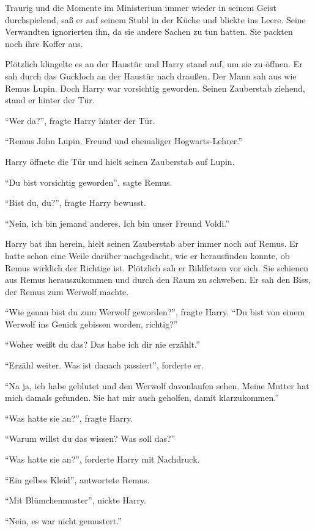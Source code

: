 Traurig und die Momente im Ministerium immer wieder in seinem Geist durchspielend, saß er auf seinem Stuhl in der Küche und blickte ins Leere. Seine Verwandten ignorierten ihn, da sie andere Sachen zu tun hatten. Sie packten noch ihre Koffer aus.

Plötzlich klingelte es an der Haustür und Harry stand auf, um sie zu öffnen. Er sah durch das Guckloch an der Haustür nach draußen. Der Mann sah aus wie Remus Lupin. Doch Harry war vorsichtig geworden. Seinen Zauberstab ziehend, stand er hinter der Tür.

\enquote{Wer da?}, fragte Harry hinter der Tür.

\enquote{Remus John Lupin. Freund und ehemaliger Hogwarts-Lehrer.}

Harry öffnete die Tür und hielt seinen Zauberstab auf Lupin.

\enquote{Du bist vorsichtig geworden}, sagte Remus.

\enquote{Bist du, du?}, fragte Harry bewusst.

\enquote{Nein, ich bin jemand anderes. Ich bin unser Freund Voldi.}

Harry bat ihn herein, hielt seinen Zauberstab aber immer noch auf Remus. Er hatte schon eine Weile darüber nachgedacht, wie er herausfinden konnte, ob Remus wirklich der Richtige ist. Plötzlich sah er Bildfetzen vor sich. Sie schienen aus Remus herauszukommen und durch den Raum zu schweben. Er sah den Biss, der Remus zum Werwolf machte.

\enquote{Wie genau bist du zum Werwolf geworden?}, fragte Harry. \enquote{Du bist von einem Werwolf ins Genick gebissen worden, richtig?}

\enquote{Woher weißt du das? Das habe ich dir nie erzählt.}

\enquote{Erzähl weiter. Was ist danach passiert}, forderte er.

\enquote{Na ja, ich habe geblutet und den Werwolf davonlaufen sehen. Meine Mutter hat mich damals gefunden. Sie hat mir auch geholfen, damit klarzukommen.}

\enquote{Was hatte sie an?}, fragte Harry.

\enquote{Warum willst du das wissen? Was soll das?}

\enquote{Was hatte sie an?}, forderte Harry mit Nachdruck.

\enquote{Ein gelbes Kleid}, antwortete Remus.

\enquote{Mit Blümchenmuster}, nickte Harry.

\enquote{Nein, es war nicht gemustert.}

